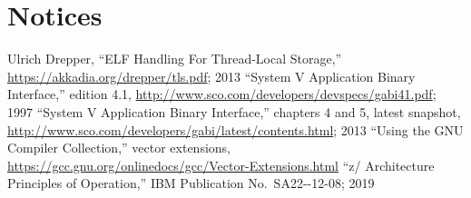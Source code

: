 \documentclass[USenglish,fontsize=11pt,twoside,%
  toc=bib,toc=idx,toc=graduated,numbers=noendperiod,
  bookmarks=true,
  bookmarksnumbered=true,
  bookmarksopen=true,
  bookmarksopenlevel=1,
  breaklinks=true,
  colorlinks=true,
  linkcolor=black,
  pdfpagelayout={TwoPageRight},
  pdfusetitle=true
]{scrreprt}
\newcommand{\ARCH}{z/\kern-1pt Ar\-chi\-tec\-ture}
\newcommand{\ARCH}{ESA/390}
\begin{document}
\appendix


\chapter{Notices}



\newcommand{\bibTitle}[1]{``#1''}

\begin{thebibliography}{9}
  Ulrich Drepper,
  \bibTitle{ELF Handling For Thread-Local Storage,}
  \url{https://akkadia.org/drepper/tls.pdf};
  2013
  \bibTitle{System V Application Binary Interface,}
  edition 4.1,
  \url{http://www.sco.com/developers/devspecs/gabi41.pdf};
  1997
  \bibTitle{System V Application Binary Interface,}
  chapters 4 and 5, latest snapshot,
  \url{http://www.sco.com/developers/gabi/latest/contents.html};
  2013
  \bibTitle{Using the GNU Compiler Collection,}
  vector extensions,
  \url{https://gcc.gnu.org/onlinedocs/gcc/Vector-Extensions.html}
  \bibTitle{\ARCH{} Principles of Operation,}
  IBM Publication No.~SA22-{-12-08\fi};
  2019
\end{thebibliography}

\printindex
\end{document}
